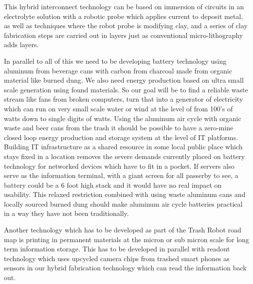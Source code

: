 This hybrid interconnect technology can be based on immersion of circuits in an electrolyte solution with a robotic probe which applies current to deposit metal, as well as techniques where the robot probe is modifying clay, and a series of clay fabrication steps are carried out in layers just as conventional micro-lithography adds layers.

In parallel to all of this we need to be developing battery technology using aluminum from beverage cans with carbon from charcoal made from organic material like burned dung.  We also need energy production based on ultra small scale generation using found materials. So our goal will be to find a reliable waste stream like fans from broken computers, turn that into a generator of electricity which can run on very small scale water or wind at the level of from 100's of watts down to single digits of watts.  Using the aluminum air cycle with organic waste and beer cans from the trash it should be possible to have a zero-mine closed loop energy production and storage system at the level of IT platforms.  Building IT infrastructure as a shared resource in some local public place which stays fixed in a location removes the severe demands currently placed on battery technology for networked devices which have to fit in a pocket.  If servers also serve as the information terminal, with a giant screen for all passerby to see, a battery could be a 6 foot high stack and it would have no real impact on usability.  This relaxed restriction combined with using waste aluminum cans and locally sourced burned dung should make aluminum air cycle batteries practical in a way they have not been traditionally.

Another technology which has to be developed as part of the Trash Robot road map is printing in permanent materials at the micron or sub micron scale for long term information storage.  This has to be developed in parallel with readout technology which uses upcycled camera chips from trashed smart phones as sensors in our hybrid fabrication technology which can read the information back out.

